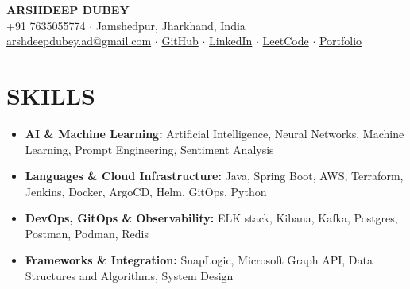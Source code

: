\documentclass[10pt,a4paper]{article}
\begin{document}
\pagestyle{empty}

\begin{center}
    {\LARGE \bfseries \color{primary} ARSHDEEP DUBEY} \\[4pt]
    \small
    +91 7635055774 $\cdot$ Jamshedpur, Jharkhand, India \\[3pt]
    \href{mailto:arshdeepdubey.ad@gmail.com}{arshdeepdubey.ad@gmail.com} $\cdot$ \href{https://github.com/Arshdeepdubey}{GitHub} $\cdot$ \href{https://www.linkedin.com/in/dubey-arshdeep}{LinkedIn} $\cdot$ \href{https://leetcode.com/u/zorojuro_conqueror/}{LeetCode} $\cdot$ \href{https://arshdeepdubey.github.io/Portfolio/}{Portfolio}
\end{center}
\vspace{-4pt}

\section*{SKILLS}
\small

\begin{itemize}
\item \textbf{AI \& Machine Learning:} Artificial Intelligence, Neural Networks, Machine Learning, Prompt Engineering, Sentiment Analysis
\item \textbf{Languages \& Cloud Infrastructure:} Java, Spring Boot, AWS, Terraform, Jenkins, Docker, ArgoCD, Helm, GitOps, Python
\item \textbf{DevOps, GitOps \& Observability:} ELK stack, Kibana, Kafka, Postgres, Postman, Podman, Redis
\item \textbf{Frameworks \& Integration:} SnapLogic, Microsoft Graph API, Data Structures and Algorithms, System Design
\end{itemize}
\end{document}
